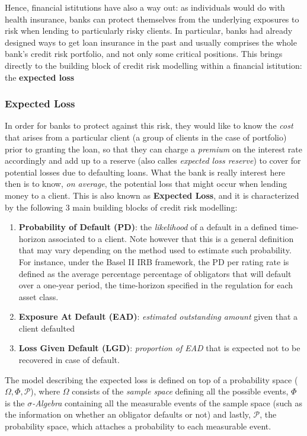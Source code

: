 \documentclass[a4paper,12pt]{article}
\begin{document}
    Hence, financial istitutions have also a way out: as individuals would do with health insurance, banks can protect themselves from the underlying exposures to risk when lending to particularly risky clients. 
    In particular, banks had already designed ways to get loan insurance in the past and usually comprises the whole bank's credit risk portfolio, and not only some critical positions. This brings directly to
    the building block of credit risk modelling within a financial istitution: the \textbf{expected loss}

    \subsubsection{Expected Loss}
    In order for banks to protect against this risk, they would like to know the \textit{cost} that arises from a particular client (a group of clients in the case of portfolio) 
    prior to granting the loan, so that they can charge a \textit{premium} on the interest rate accordingly and add up to a reserve (also calles \textit{expected loss reserve}) to cover for potential losses due to defaulting loans.
    What the bank is really interest here then is to know, \textit{on average}, the potential loss that might occur when lending money to a client. This is also known as \textbf{Expected Loss}, and it is characterized by the following 3 main building blocks of credit risk modelling:

        \begin{enumerate}
            \item \textbf{Probability of Default (PD)}: the \textit{likelihood} of a default in a defined time-horizon associated to a client. Note however that this is a general definition that may vary depending on the method used to estimate such probability. For instance, under the Basel II IRB framework, the PD per rating rate is defined as the average percentage percentage of obligators that will default over a one-year period, the time-horizon specified in the regulation for each asset class.
            \item \textbf{Exposure At Default (EAD)}: \textit{estimated outstanding amount} given that a client defaulted
            \item \textbf{Loss Given Default (LGD)}: \textit{proportion of EAD} that is expected not to be recovered in case of default.
        \end{enumerate}
    The model describing the expected loss is defined on top of a probability space ($\Omega,\Phi,\mathcal{P}$), where $\Omega$ consists of the \textit{sample space} defining all the possible events, 
    $\Phi$ is the \textit{$\sigma$-Algebra} containing all the measurable events of the sample space (such as the information on whether an obligator defaults or not) and lastly, 
    $\mathcal{P}$, the probability space, which attaches a probability to each measurable event.
\end{document}
